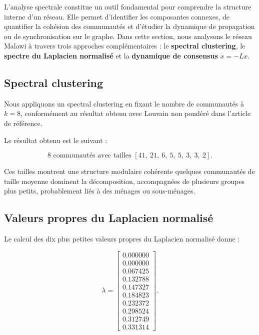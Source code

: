 \documentclass[10pt,twocolumn]{article}
\begin{document}
L’analyse spectrale constitue un outil fondamental pour comprendre la structure 
interne d’un réseau. Elle permet d’identifier les composantes connexes, 
de quantifier la cohésion des communautés et d’étudier la dynamique 
de propagation ou de synchronisation sur le graphe. Dans cette section, 
nous analysons le réseau Malawi à travers trois approches complémentaires :
le \textbf{spectral clustering}, le \textbf{spectre du Laplacien normalisé} 
et la \textbf{dynamique de consensus} $\dot{x}=-Lx$.

\subsection{Spectral clustering}

Nous appliquons un spectral clustering en fixant le nombre de communautés à 
$k = 8 $, conformément au résultat obtenu avec Louvain non pondéré dans l’article de référence.

Le résultat obtenu est le suivant :

\[
\text{8 communautés avec tailles } 
[41,\ 21,\ 6,\ 5,\ 5,\ 3,\ 3,\ 2].
\]



Ces tailles montrent une structure modulaire cohérente 
quelques communautés de taille moyenne dominent la décomposition, 
accompagnées de plusieurs groupes plus petits, probablement liés 
à des ménages ou sous-ménages.

\subsection{Valeurs propres du Laplacien normalisé}

Le calcul des dix plus petites valeurs propres du Laplacien normalisé donne :

\[
\lambda = 
\begin{bmatrix}
0.000000 \\
0.000000 \\
0.067425 \\
0.132788 \\
0.147327 \\
0.184823 \\
0.232372 \\
0.298524 \\
0.312749 \\
0.331314
\end{bmatrix}.
\]
\end{document}
